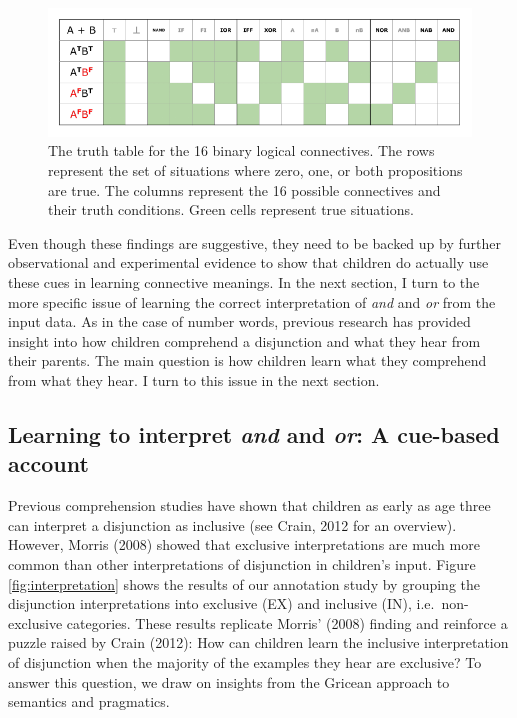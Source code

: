 \documentclass[,man,floatsintext]{apa6}
\begin{document}
\begin{figure}[tb]

{\centering \includegraphics{figs/binaryLogicalConnectivess-1} 

}

\caption{The truth table for the 16 binary logical connectives. The rows represent the set of situations where zero, one, or both propositions are true. The columns represent the 16 possible connectives and their truth conditions. Green cells represent true situations.}\label{fig:binaryLogicalConnectivess}
\end{figure}

Even though these findings are suggestive, they need to be backed up by further observational and experimental evidence to show that children do actually use these cues in learning connective meanings. In the next section, I turn to the more specific issue of learning the correct interpretation of \emph{and} and \emph{or} from the input data. As in the case of number words, previous research has provided insight into how children comprehend a disjunction and what they hear from their parents. The main question is how children learn what they comprehend from what they hear. I turn to this issue in the next section.

\hypertarget{myaccount}{%
\subsection{\texorpdfstring{Learning to interpret \emph{and} and \emph{or}: A cue-based account}{Learning to interpret and and or: A cue-based account}}\label{myaccount}}

Previous comprehension studies have shown that children as early as age three can interpret a disjunction as inclusive (see Crain, 2012 for an overview). However, Morris (2008) showed that exclusive interpretations are much more common than other interpretations of disjunction in children's input. Figure \ref{fig:interpretation} shows the results of our annotation study by grouping the disjunction interpretations into exclusive (EX) and inclusive (IN), i.e.~non-exclusive categories. These results replicate Morris' (2008) finding and reinforce a puzzle raised by Crain (2012): How can children learn the inclusive interpretation of disjunction when the majority of the examples they hear are exclusive? To answer this question, we draw on insights from the Gricean approach to semantics and pragmatics.
\end{document}
